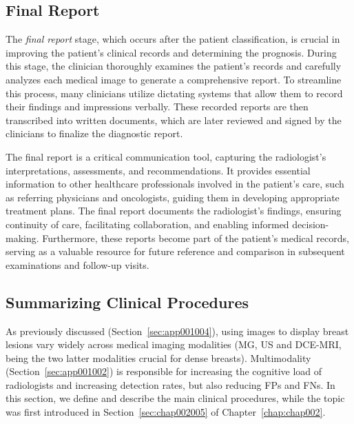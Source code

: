\subsection{Final Report}
\label{sec:app001005003}

The {\it final report} stage, which occurs after the patient classification, is crucial in improving the patient's clinical records and determining the prognosis.
During this stage, the clinician thoroughly examines the patient's records and carefully analyzes each medical image to generate a comprehensive report.
To streamline this process, many clinicians utilize dictating systems that allow them to record their findings and impressions verbally.
These recorded reports are then transcribed into written documents, which are later reviewed and signed by the clinicians to finalize the diagnostic report.

The final report is a critical communication tool, capturing the radiologist's interpretations, assessments, and recommendations.
It provides essential information to other healthcare professionals involved in the patient's care, such as referring physicians and oncologists, guiding them in developing appropriate treatment plans.
The final report documents the radiologist's findings, ensuring continuity of care, facilitating collaboration, and enabling informed decision-making.
Furthermore, these reports become part of the patient's medical records, serving as a valuable resource for future reference and comparison in subsequent examinations and follow-up visits.

\subsection{Summarizing Clinical Procedures}
\label{sec:app001005004}

As previously discussed (Section~\ref{sec:app001004}), using images to display breast lesions vary widely across medical imaging modalities (\ac{MG}, \ac{US} and \ac{DCE}-\ac{MRI}, being the two latter modalities crucial for dense breasts).
Multimodality (Section~\ref{sec:app001002}) is responsible for increasing the cognitive load of radiologists and increasing detection rates, but also reducing \acp{FP} and \acp{FN}.
In this section, we define and describe the main clinical procedures, while the topic was first introduced in Section~\ref{sec:chap002005} of Chapter~\ref{chap:chap002}.

\vspace{1.50mm}


